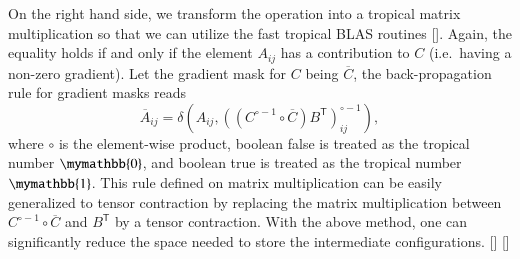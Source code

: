 \documentclass[onefignum, onetabnum]{siamart190516}
\newcommand{\<}{\langle}
\renewcommand{\>}{\rangle}
\newcommand{\red}[1]{[{\bf  \color{red}{ST: #1}}]}
\newcommand{\blue}[1]{[{\bf  \color{blue}{JG: #1}}]}
\begin{document}
On the right hand side, we transform the operation into a tropical matrix multiplication so that we can utilize the fast tropical BLAS routines \red{do we need to cite here?}.
Again, the equality holds if and only if the element $A_{ij}$ has a contribution to $C$ (i.e.\ having a non-zero gradient). Let the gradient mask for $C$ being $\overline C$, the back-propagation rule for gradient masks reads
\begin{equation}
\overline{A}_{ij} = \delta \left(A_{ij}, \left( \left( C^{\circ-1} \circ \overline C \right) B^{\mathsf{T}} \right)_{ij}^{\circ -1} \right),
\end{equation}
where $\circ$ is the element-wise product, boolean false is treated as the tropical number $\mymathbb{0}$, and boolean true is treated as the tropical number $\mymathbb{1}$.
This rule defined on matrix multiplication can be easily generalized to tensor contraction by replacing the matrix multiplication between $C^{\circ-1} \circ \overline C$ and $B^{\mathsf{T}}$ by a tensor contraction. With the above method, one can significantly reduce the space needed to store the intermediate configurations. \blue{maybe add an appendix?} \red{I've edited this section a bit, and I think it's okay now - probably don't need an appendix.}  %
%
\end{document}
